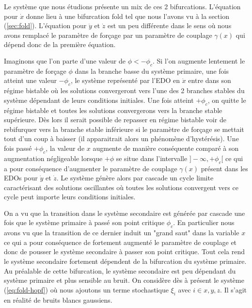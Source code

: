 Le système que nous étudions présente un mix de ces 2 bifurcations. L'équation pour $\dot{x}$ donne lieu à une bifurcation fold tel que nous l'avons vu à la section (\ref{sec:fold}). L'équation pour $\dot{y}$ et $\dot{z}$ est un peu différente dans le sens où nous avons remplacé le paramètre de forçage par un paramètre de couplage $\gamma(x)$ qui dépend donc de la première équation.


Imaginons que l’on parte d’une valeur de $\phi < - \phi_c$. Si l’on augmente lentement le paramètre de forçage $\phi$ dans la branche basse du système primaire, une fois atteint une valeur $-\phi_c$, le système représenté par l’EDO en $\dot{x}$ entre dans son régime bistable où les solutions convergeront vers l’une des 2 branches stables du système dépendant de leurs conditions initiales. Une fois atteint $+\phi_c$, on quitte le régime bistable et toutes les solutions convergerons vers la branche stable supérieure. Dès lors il serait possible de repasser en régime bistable voir de rebifurquer vers la branche stable inférieure si le paramètre de forçage se mettait tout d’un coup à baisser (il apparaitrait alors un phénomène d’hystérésis). Une fois passé $+\phi_c$, la valeur de $x$ augmente de manière conséquente comparé à son augmentation négligeable lorsque $+\phi$ se situe dans l’intervalle $]-\infty, +\phi_c[$ ce qui a pour conséquence d’augmenter le paramètre de couplage $\gamma(x)$ présent dans les EDOs pour $\dot{y}$ et $\dot{z}$.  Le système génère alors par cascade un cycle limite caractérisant des solutions oscillantes où toutes les solutions convergent vers ce cycle peut importe leurs conditions initiales.



On a vu que la transition dans le système secondaire est générée par cascade une fois que le système primaire à passé son point critique $\phi_c$. En particulier nous avons vu que la transition de ce dernier induit un "grand saut" dans la variable $x$ ce qui a pour conséquence de fortement augmenté le paramètre de couplage et donc de pousser le système secondaire à passer son point critique. Tout cela rend le système secondaire fortement dépendent de la bifurcation du système primaire. Au préalable de cette bifurcation, le système secondaire est peu dépendant du système primaire et plus sensible au bruit.
On considère dès à présent le système (\ref{eq:fold-hopf}) où nous ajoutons un terme stochastique $\xi_i$ avec $i \in {x, y, z}$. Il s'agit en réalité de bruits blancs gaussiens.

